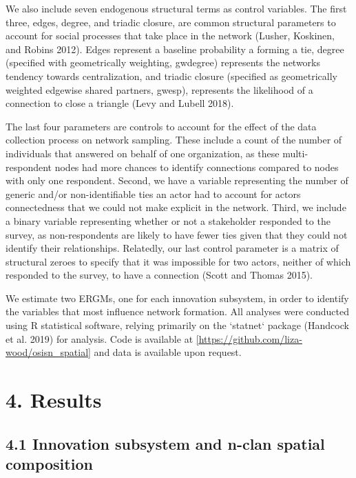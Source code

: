 \documentclass[twoside,12pt,final]{ucthesis-CA2012}
\begin{document}
\begin{ucmainmatter}
We also include seven endogenous structural terms as control variables.
The first three, edges, degree, and triadic closure, are common
structural parameters to account for social processes that take place in
the network (Lusher, Koskinen, and Robins
2012). Edges represent a
baseline probability a forming a tie, degree (specified with
geometrically weighting, \textquotesingle gwdegree\textquotesingle) represents the network\textquotesingle s
tendency towards centralization, and triadic closure (specified as
geometrically weighted edgewise shared partners, \textquotesingle gwesp\textquotesingle), represents
the likelihood of a connection to close a triangle (Levy and Lubell
2018).

The last four parameters are controls to account for the effect of the
data collection process on network sampling. These include a count of
the number of individuals that answered on behalf of one organization,
as these multi-respondent nodes had more chances to identify connections
compared to nodes with only one respondent. Second, we have a variable
representing the number of generic and/or non-identifiable ties an actor
had to account for actors\textquotesingle{} connectedness that we could not make
explicit in the network. Third, we include a binary variable
representing whether or not a stakeholder responded to the survey, as
non-respondents are likely to have fewer ties given that they could not
identify their relationships. Relatedly, our last control parameter is a
matrix of \textquotesingle structural zeroes\textquotesingle{} to specify that it was impossible for
two actors, neither of which responded to the survey, to have a
connection (Scott and Thomas
2015).

We estimate two ERGMs, one for each innovation subsystem, in order to
identify the variables that most influence network formation. All
analyses were conducted using R statistical software, relying primarily
on the `statnet` package (Handcock et al.
2019) for analysis. Code is
available at
\href{https://github.com/liza-wood/osisn_spatial}{{[}https://github.com/liza-wood/osisn\_spatial{]}}
and data is available upon request.

\hypertarget{results-1}{%
\section{4. Results}\label{results-1}}

\hypertarget{innovation-subsystem-and-n-clan-spatial-composition}{%
\subsection{4.1 Innovation subsystem and n-clan spatial composition}\label{innovation-subsystem-and-n-clan-spatial-composition}}


\end{ucmainmatter}
\end{document}
